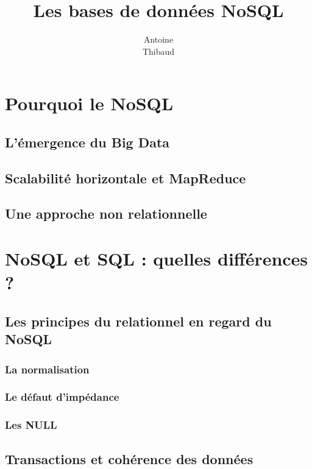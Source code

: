 \documentclass[12pt,titlepage,a4paper]{report}
\title{Les bases de données NoSQL}
\author{Antoine \bsc{Augusti}\\ Thibaud \bsc{Dauce}}
\begin{document}
	\dominitoc
	\tableofcontents

	\chapter{Pourquoi le NoSQL}
	\minitoc
	
		\section{L'émergence du Big Data}
		

		\section{Scalabilité horizontale et MapReduce}
		

		\section{Une approche non relationnelle}
			

	\chapter{NoSQL et SQL : quelles différences ?}
	\minitoc
		
		\section{Les principes du relationnel en regard du NoSQL}
			\subsection{La normalisation}
			\subsection{Le défaut d'impédance}
			\subsection{Les NULL}
		
		\section{Transactions et cohérence des données}
\end{document}
